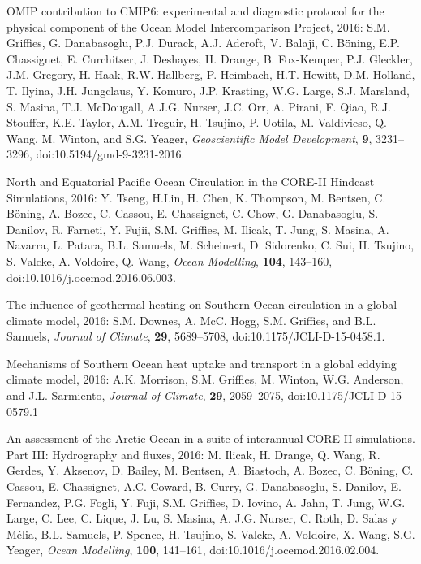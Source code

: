 \begin{etaremune}

\item OMIP contribution to CMIP6: experimental and diagnostic protocol for the physical component of the Ocean Model Intercomparison  Project, 2016: S.M. Grif\/f\/ies, G. Danabasoglu, P.J. Durack,  A.J. Adcroft, V. Balaji, C. B\"{o}̈ning, E.P. Chassignet, E. Curchitser, J. Deshayes, H. Drange, B. Fox-Kemper, P.J. Gleckler, J.M. Gregory, H. Haak, R.W. Hallberg, P. Heimbach, H.T. Hewitt, D.M. Holland, T. Ilyina, J.H. Jungclaus, Y. Komuro, J.P. Krasting, W.G. Large, S.J. Marsland, S. Masina, T.J. McDougall, A.J.G. Nurser, J.C. Orr, A. Pirani, F. Qiao, R.J. Stouffer, K.E. Taylor, A.M. Treguir, H. Tsujino, P. Uotila, M. Valdivieso, Q. Wang, M. Winton, and S.G. Yeager, {\it Geoscientific Model Development}, {\bf 9}, 3231--3296, doi:10.5194/gmd-9-3231-2016.

\item North and Equatorial Pacific Ocean Circulation in the CORE-II Hindcast Simulations, 2016: Y. Tseng, H.Lin, H. Chen, K.  Thompson,  M. Bentsen, C. B\"{o}ning, A. Bozec, C. Cassou, E.  Chassignet,  C. Chow, G. Danabasoglu, S. Danilov, R. Farneti, Y. Fujii, S.M. Grif\/f\/ies, M. Ilicak, T. Jung, S. Masina, A. Navarra,
  L. Patara, B.L.  Samuels, M. Scheinert, D. Sidorenko, C. Sui,  H. Tsujino, S. Valcke, A. Voldoire, Q. Wang, {\it Ocean Modelling},  {\bf 104}, 143--160, doi:10.1016/j.ocemod.2016.06.003.

\item The influence of geothermal heating on Southern Ocean  circulation in a global climate model, 2016: S.M. Downes,  A. McC. Hogg, S.M. Grif\/f\/ies, and B.L. Samuels, {\it Journal of Climate}, {\bf 29}, 5689--5708,
  doi:10.1175/JCLI-D-15-0458.1.

\item Mechanisms of Southern Ocean heat uptake and transport in a global eddying climate model, 2016: A.K. Morrison, S.M. Grif\/f\/ies, M. Winton, W.G. Anderson, and J.L. Sarmiento, {\it Journal of Climate}, {\bf 29}, 2059--2075, doi:10.1175/JCLI-D-15-0579.1

\item An assessment of the Arctic Ocean in a suite of interannual  CORE-II simulations. Part III: Hydrography and fluxes, 2016:  M. Ilicak, H. Drange, Q. Wang, R. Gerdes, Y. Aksenov, D. Bailey,  M. Bentsen, A. Biastoch, A. Bozec, C. B\"{o}ning, C. Cassou,  E. Chassignet, A.C. Coward, B. Curry, G. Danabasoglu, S. Danilov,
  E. Fernandez, P.G. Fogli, Y. Fuji, S.M. Grif\/f\/ies,
  D. Iovino, A. Jahn, T. Jung, W.G. Large, C. Lee, C. Lique, J. Lu,  S. Masina, A. J.G. Nurser, C. Roth, D. Salas y M\'{e}lia,  B.L. Samuels, P. Spence, H. Tsujino, S. Valcke, A. Voldoire,  X. Wang, S.G. Yeager, {\it Ocean Modelling}, {\bf 100}, 141--161,
  doi:10.1016/j.ocemod.2016.02.004.


\end{etaremune}
